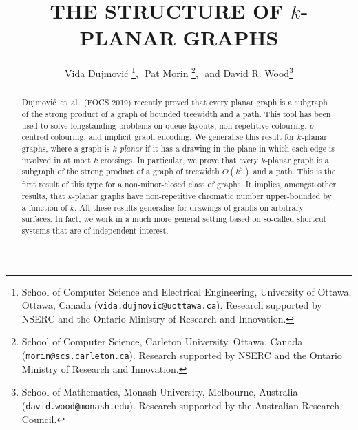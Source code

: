 \documentclass{patmorin}
\title{\MakeUppercase{The Structure of $k$-Planar Graphs}}
\author{Vida Dujmovi\'c%
        \thanks{School of Computer Science and Electrical Engineering,
                University of Ottawa, Ottawa, Canada (\texttt{vida.dujmovic@uottawa.ca}).
                Research  supported by NSERC and the Ontario Ministry of Research and Innovation.},\,\,
        Pat Morin%
        \thanks{School of Computer Science, Carleton University, Ottawa, Canada (\texttt{morin@scs.carleton.ca}).                 Research  supported by NSERC and the Ontario Ministry of Research and Innovation.},\,\, and
        David R. Wood\thanks{School of Mathematics, Monash University, Melbourne, Australia (\texttt{david.wood@monash.edu}). Research supported by the Australian Research Council.}
}
\renewcommand{\ge}{\geqslant}
\begin{document}
\begin{titlepage}
\maketitle

\begin{abstract}
Dujmovi\'c~et~al.~(FOCS 2019) recently proved that every planar graph is a subgraph of the strong product of a graph of bounded treewidth and a path. This tool has been used to solve longstanding problems on queue layouts, non-repetitive colouring, $p$-centred colouring, and implicit graph encoding. We generalise this result for $k$-planar graphs, where a graph is \emph{$k$-planar} if it has a drawing in the plane in which each edge is involved in at most $k$ crossings. In particular, we prove that every $k$-planar graph is a subgraph of the strong product of a graph of treewidth $O(k^5)$ and a path. This is the first result of this type for a non-minor-closed class of graphs. It implies, amongst other results, that $k$-planar graphs have non-repetitive chromatic number upper-bounded by a function of $k$. All these results generalise for drawings of graphs on arbitrary surfaces. In fact, we work in a much more general setting based on so-called shortcut systems that are of independent interest. 
\end{abstract}
\end{titlepage}


\end{document}
